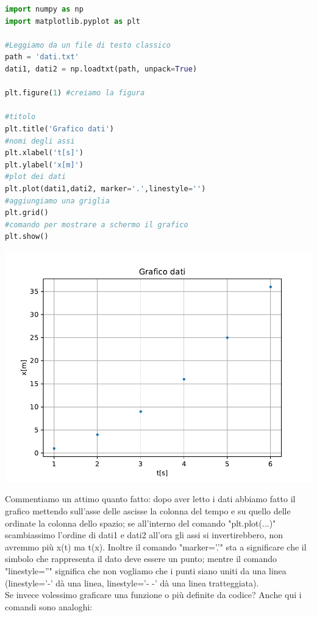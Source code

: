 \documentclass[10pt,a4paper]{article}
\begin{document}
\begin{multicols}{2}

\begin{lstlisting}[language=Python]
import numpy as np
import matplotlib.pyplot as plt

#Leggiamo da un file di testo classico
path = 'dati.txt'
dati1, dati2 = np.loadtxt(path, unpack=True)

plt.figure(1) #creiamo la figura

#titolo
plt.title('Grafico dati')
#nomi degli assi
plt.xlabel('t[s]')
plt.ylabel('x[m]')
#plot dei dati
plt.plot(dati1,dati2, marker='.',linestyle='')
#aggiungiamo una griglia
plt.grid()
#comando per mostrare a schermo il grafico
plt.show()
\end{lstlisting}


\includegraphics[scale=0.5]{img/grafico1.pdf}

\end{multicols}
Commentiamo un attimo quanto fatto: dopo aver letto i dati abbiamo fatto il grafico mettendo sull'asse delle ascisse la colonna del tempo e su quello delle ordinate la colonna dello spazio; se all'interno del comando "plt.plot(...)" scambiassimo l'ordine di dati1 e dati2 all'ora gli assi si invertirebbero, non avremmo più x(t) ma t(x). Inoltre il comando "marker='.'" sta a significare che il simbolo che rappresenta il dato deve essere un punto; mentre il comando "linestyle=''" significa che non vogliamo che i punti siano uniti da una linea (linestyle='-' dà una linea, linestyle='- -' dà una linea tratteggiata).\\
Se invece volessimo graficare una funzione o più definite da codice? Anche qui i comandi sono analoghi:
\end{document}
